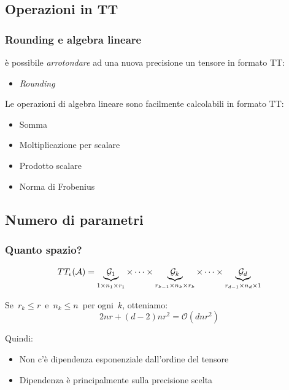\documentclass[compress]{beamer}
\theoremstyle{definition}
\theoremstyle{plain}
\begin{document}
\subsection{Operazioni in TT}
\begin{frame}
\frametitle{Rounding e algebra lineare}
è possibile \emph{arrotondare} ad una nuova precisione un tensore in formato TT:
\begin{itemize}
	\item \emph{Rounding}
\end{itemize}

\pause
\vspace{3mm}
Le operazioni di algebra lineare sono facilmente calcolabili in formato TT:
\begin{itemize}
\item Somma
\item Moltiplicazione per scalare
\item Prodotto scalare
\item Norma di Frobenius
\end{itemize}
\end{frame}

\subsection{Numero di parametri}
\begin{frame}
\frametitle{Quanto spazio?}
\begin{equation*}
	TT_\epsilon(\mathcal{A}) = 
	\underbrace{\mathcal{G}_1}_{1 \times n_1 \times r_1}
	\times \cdots \times
	\underbrace{\mathcal{G}_k}_{r_{k-1} \times n_k \times r_k}
	\times \cdots \times 
	\underbrace{\mathcal{G}_d}_{r_{d-1} \times n_d \times 1}
\end{equation*}	

\vspace{5mm}
Se $\,r_k \leq r\,$ e $\,n_k \leq n\,$ per ogni $\,k$, otteniamo:
\begin{equation*}
	2nr + (d-2)nr^2 = \mathcal{O}(dnr^2)
\end{equation*}

Quindi:
\begin{itemize}
	\item Non c'è dipendenza esponenziale dall'ordine del tensore
	\item Dipendenza è principalmente sulla precisione scelta
\end{itemize}
\end{frame}
\end{document}
